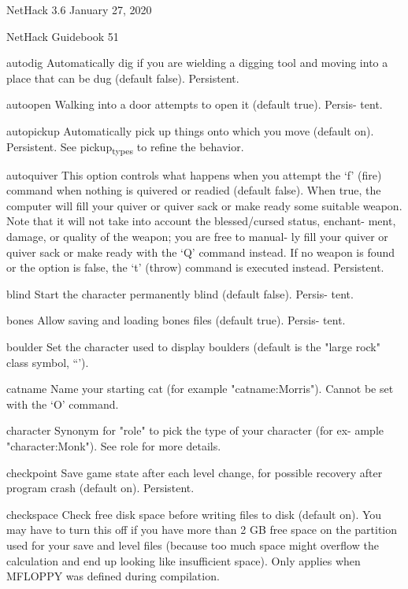 \documentclass[11pt]{article}
\begin{document}
NetHack 3.6                   January 27, 2020





NetHack Guidebook                       51



autodig
 Automatically dig if you are wielding a digging tool and moving
 into a place that can be dug (default false). Persistent.

autoopen
 Walking into a door attempts to open it (default true). Persis-
 tent.

autopickup
 Automatically pick up things onto which you move (default on).
 Persistent. See pickup\textsubscript{types} to refine the behavior.

autoquiver
 This option controls what happens when you attempt the `f'
 (fire) command when nothing is quivered or readied (default
 false).  When true, the computer will fill your quiver or
 quiver sack or make ready some suitable weapon. Note that it
 will not take into account the blessed/cursed status, enchant-
 ment, damage, or quality of the weapon; you are free to manual-
 ly fill your quiver or quiver sack or make ready with the `Q'
 command instead. If no weapon is found or the option is false,
 the `t' (throw) command is executed instead. Persistent.

blind
 Start the character permanently blind (default false). Persis-
 tent.

bones
 Allow saving and loading bones files (default true).  Persis-
 tent.

boulder
 Set the character used to display boulders (default is the
 "large rock" class symbol, ``').

catname
 Name your starting cat (for example "catname:Morris").  Cannot
 be set with the `O' command.

character
 Synonym for "role" to pick the type of your character (for ex-
 ample "character:Monk"). See role for more details.

checkpoint
 Save game state after each level change, for possible recovery
 after program crash (default on). Persistent.

checkspace
 Check free disk space before writing files to disk (default
 on). You may have to turn this off if you have more than 2 GB
 free space on the partition used for your save and level files
 (because too much space might overflow the calculation and end
 up looking like insufficient space). Only applies when MFLOPPY
 was defined during compilation.
\end{document}
